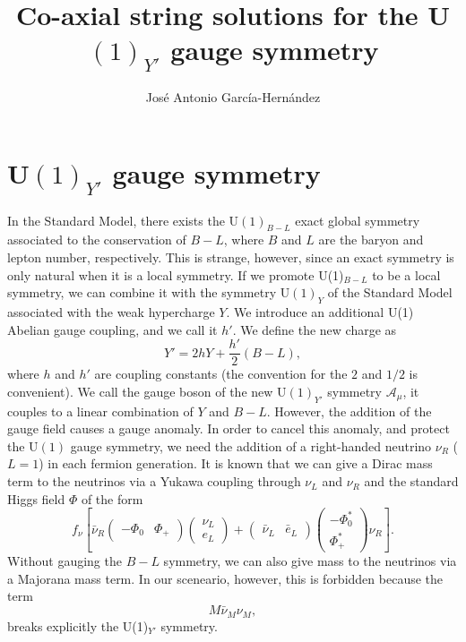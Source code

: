 \documentclass[12pt,a4paper]{article}
\author{José Antonio García-Hernández}
\title{Co-axial string solutions for the U$(1)_{Y'}$ gauge symmetry}
\begin{document}
\maketitle
\section{U$(1)_{Y'}$ gauge symmetry}
In the Standard Model, there exists the U$(1)_{B-L}$ exact global symmetry associated to the conservation of $B-L$, where $B$ and $L$ are the baryon and lepton number, respectively. This is strange, however, since an exact symmetry is only natural when it is a local symmetry. If we promote U(1)$_{B-L}$ to be a local symmetry, we can combine it with the symmetry U$(1)_Y$ of the Standard Model associated with the weak hypercharge $Y$. We introduce an additional U(1) Abelian gauge coupling, and we call it $h'$. We define the new charge as
\begin{equation}
	Y' = 2hY + \frac{h'}{2}(B-L),
\end{equation}
where $h$ and $h'$ are coupling constants (the convention for the $2$ and $1/2$ is convenient). We call the gauge boson of the new U$(1)_{Y'}$ symmetry $\mathcal{A}_{\mu}$, it couples to a linear combination of $Y$ and $B-L$. However, the addition of the gauge field causes a gauge anomaly. In order to cancel this anomaly, and protect the U$(1)$ gauge symmetry, we need the addition of a right-handed neutrino $\nu_R$ ($L = 1$) in each fermion generation. It is known that we can give a Dirac mass term to the neutrinos via a Yukawa coupling through $\nu_L$ and $\nu_R$ and the standard Higgs field $\Phi$ of the form
\begin{equation}
f_{\nu} \left[\bar{\nu}_R \begin{pmatrix}-\Phi_0 & \Phi_+\end{pmatrix}\begin{pmatrix}
	\nu_L \\
	e_L
\end{pmatrix} + \begin{pmatrix}\bar{\nu}_L & \bar{e}_L\end{pmatrix}
\begin{pmatrix}
	-\Phi^*_0 \\
	\Phi^*_+
\end{pmatrix}\nu_R\right].
\end{equation}
Without gauging the $B-L$ symmetry, we can also give mass to the neutrinos via a Majorana mass term. In our sceneario, however, this is forbidden because the term 
\begin{equation}
	M\bar{\nu}_M \nu_M,
\end{equation}
breaks explicitly the U(1)$_{Y'}$ symmetry. 
\end{document}
